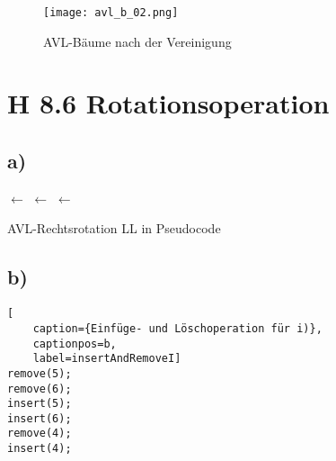 \documentclass[a4paper]{article}
\begin{document}
\begin{figure}[!h]
	\begin{center}
		\texttt{[image: avl\_b\_02.png]}
	\end{center}
	\caption{AVL-Bäume nach der Vereinigung}
	\label{fig:after_union}
\end{figure}

\section*{H 8.6 Rotationsoperation}

\subsection*{a)}

\begin{algorithm}[H]



	\BlankLine
	\E $\leftarrow$ \parent{\W}\;
	\LE $\leftarrow$ \left{\W}\;
	\R $\leftarrow$ \right{\LE}\;

	\BlankLine

	\eIf{\left{\E} = \W}{
		\setleft{\E,\LE}\;
	}{
		\setright{\E,\LE}\;
	}

	\BlankLine
	\setleft{\W,\R}\;

	\BlankLine
	\setright{\LE, \W}\;
	
	\BlankLine
	\setparent{\LE, \E}\;
	\setparent{\W, \LE}\;
	\setparent{\R, \W}\;

	\caption{AVL-Rechtsrotation LL in Pseudocode}
\end{algorithm}

\clearpage
\subsection*{b)}

\begin{lstlisting}[
	caption={Einfüge- und Löschoperation für i)},
	captionpos=b,
	label=insertAndRemoveI]
remove(5);
remove(6);
insert(5);
insert(6);
remove(4);
insert(4);
\end{lstlisting}
\end{document}
